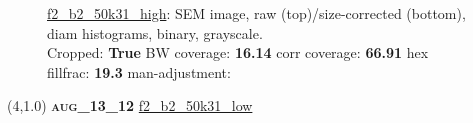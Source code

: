 \begin{figure}[h!]
\label{semimg31}
\caption*{\hyperlink{covtableaug_13_12}{\color{blue} \small \ttfamily f2\_b2\_50k31\_high}: SEM image, raw (top)/size-corrected (bottom), diam histograms, binary, grayscale.\\Cropped: {\bf True} \;\; BW coverage: {\bf 16.14} \:\: corr coverage: {\bf 66.91} \:\: hex fillfrac: {\bf 19.3} \:\: man-adjustment: {\bf \color{blue}{Yes}}}
\end{figure}
\newpage

\begin{textblock}{5}(4,1.0)
{\bf \textsc{aug\_13\_12}}
\hspace{4.5cm}
\hyperlink{covtableaug_13_12}{\color{blue} \large \ttfamily f2\_b2\_50k31\_low}
\end{textblock}

